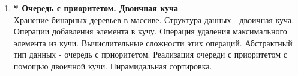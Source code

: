 \documentclass{article}
\begin{document}
\begin{enumerate}
\item \textbf{* Очередь с приоритетом. Двоичная куча}\\
Хранение бинарных деревьев в массиве. Структура данных - двоичная куча. Операции добавления элемента в кучу. Операция удаления максимального элемента из кучи. Вычислительные сложности этих операций. Абстрактный тип данных - очередь с приоритетом. Реализация очереди с приоритетом с помощью двоичной кучи. Пирамидальная сортировка.

\fi
\end{enumerate}
\end{document}
